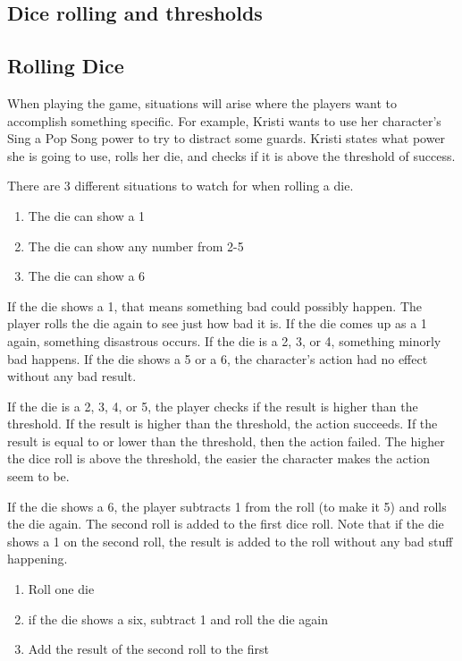 \begin{flushleft}

\chapter{Dice rolling and thresholds}

\section*{Rolling Dice}

When playing the game, situations will arise where the players want to
accomplish something specific. For example, Kristi wants to use her character's
Sing a Pop Song power to try to distract some guards. Kristi states what power
she is going to use, rolls her die, and checks if it is above the
threshold of success.

There are 3 different situations to watch for when rolling a die.

\begin{enumerate}
    \item{The die can show a 1}
    \item{The die can show any number from 2-5}
    \item{The die can show a 6}
\end{enumerate}

If the die shows a 1, that means something bad could possibly happen. The
player rolls the die again to see just how bad it is. If the die comes up as a
1 again, something disastrous occurs. If the die is a 2, 3, or 4, something
minorly bad happens. If the die shows a 5 or a 6, the character's action
had no effect without any bad result.

If the die is a 2, 3, 4, or 5, the player checks if the result is higher than
the threshold. If the result is higher than the threshold, the action succeeds.
If the result is equal to or lower than the threshold, then the action failed.
The higher the dice roll is above the threshold, the easier the character makes
the action seem to be.

If the die shows a 6, the player subtracts 1 from the roll (to make it 5)
and rolls the die again. The second roll is added to the first dice roll. Note
that if the die shows a 1 on the second roll, the result is added to the roll
without any bad stuff happening.

\begin{enumerate}
    \item{Roll one die}
    \item{if the die shows a six, subtract 1 and roll the die again}
    \item{Add the result of the second roll to the first}
\end{enumerate}


\end{flushleft}
